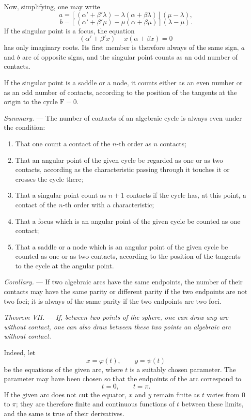 \documentclass[11pt]{article}
\begin{document}
Now, simplifying, one may write
\[
a=[(\alpha'+\beta'\lambda)-\lambda(\alpha+\beta\lambda)](\mu-\lambda),
\]
\[
b=[(\alpha'+\beta'\mu)-\mu(\alpha+\beta\mu)](\lambda-\mu).
\]
If the singular point is a focus, the equation
\[
(\alpha'+\beta'x)-x(\alpha+\beta x)=0
\]
has only imaginary roots. Its first member is therefore always of the same sign, $a$ and $b$ are of opposite signs, and the singular point counts as an odd number of contacts.

If the singular point is a saddle or a node, it counts either as an even number or as an odd number of contacts, according to the position of the tangents at the origin to the cycle $\mathrm F=0$.

\emph{Summary.} --- The number of contacts of an algebraic cycle is always even under the condition:

\begin{enumerate}[label=\arabic*°]
\item That one count a contact of the $n$-th order as $n$ contacts;
\item That an angular point of the given cycle be regarded as one or as two contacts, according as the characteristic passing through it touches it or crosses the cycle there;
\item That a singular point count as $n+1$ contacts if the cycle has, at this point, a contact of the $n$-th order with a characteristic;
\item That a focus which is an angular point of the given cycle be counted as one contact;
\item That a saddle or a node which is an angular point of the given cycle be counted as one or as two contacts, according to the position of the tangents to the cycle at the angular point.
\end{enumerate}

\emph{Corollary.} --- If two algebraic arcs have the same endpoints, the number of their contacts may have the same parity or different parity if the two endpoints are not two foci; it is always of the same parity if the two endpoints are two foci.

\emph{Theorem VII.} --- \emph{If, between two points of the sphere, one can draw any arc without contact, one can also draw between these two points an algebraic arc without contact.}

Indeed, let
\[
x=\varphi(t),\qquad y=\psi(t)
\]
be the equations of the given arc, where $t$ is a suitably chosen parameter. The parameter may have been chosen so that the endpoints of the arc correspond to
\[
t=0,
\qquad
t=\pi.
\]
If the given arc does not cut the equator, $x$ and $y$ remain finite as $t$ varies from $0$ to $\pi$; they are therefore finite and continuous functions of $t$ between these limits, and the same is true of their derivatives.
\end{document}
